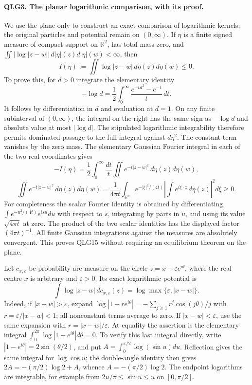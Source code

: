 \paragraph{QLG3. The planar logarithmic comparison, with its proof.}
We use the plane only to construct an exact comparison of logarithmic
kernels; the original particles and potential remain on \((0,\infty)\).
If \(\eta\) is a finite signed measure of compact support on
\(\mathbb R^2\), has total mass zero, and
\(\iint|\log|z-w||\,d|\eta|(z)d|\eta|(w)<\infty\), then
\[
 I(\eta):=\iint\log|z-w|\,d\eta(z)d\eta(w)\leq0.
 \tag{QLG15}
\]
To prove this, for \(d>0\) integrate the elementary identity
\[
 -\log d=\frac12\int_0^\infty
                    \frac{e^{-td^2}-e^{-t}}{t}\,dt.
\]
It follows by differentiation in \(d\) and evaluation at \(d=1\).
On any finite subinterval of \((0,\infty)\), the integral on the
right has the same sign as \(-\log d\) and absolute value at most
\(|\log d|\). The stipulated logarithmic integrability therefore
permits dominated passage to the full integral against \(d\eta^2\).
The constant term vanishes by the zero mass. The elementary Gaussian
Fourier integral in each of the two real coordinates gives
\[
 -I(\eta)=\frac12\int_0^\infty\frac{dt}{t}
       \iint e^{-t|z-w|^2}\,d\eta(z)d\eta(w),
\]
\[
 \iint e^{-t|z-w|^2}\,d\eta(z)d\eta(w)
 =\frac1{4\pi t}\int_{\mathbb R^2}
       e^{-|\xi|^2/(4t)}
       \left|\int e^{i\xi\cdot z}\,d\eta(z)\right|^2d\xi\geq0.
 \tag{QLG16}
\]
For completeness the scalar Fourier identity is obtained by
differentiating \(\int e^{-u^2/(4t)}e^{isu}du\) with respect to
\(s\), integrating by parts in \(u\), and using its value
\(\sqrt{4\pi t}\) at zero. The product of the two scalar identities
has the displayed factor \((4\pi t)^{-1}\). All finite Gaussian
integrations against the measures are absolutely convergent. This
proves QLG15 without requiring an equilibrium theorem on the plane.

Let \(c_{x,\varepsilon}\) be probability arc measure on the circle
\(z=x+\varepsilon e^{i\theta}\), where the real centre \(x\) is
arbitrary and \(\varepsilon>0\). Its exact logarithmic potential is
\[
 \int\log|z-w|\,dc_{x,\varepsilon}(z)
           =\log\max\{\varepsilon,|x-w|\}.
 \tag{QLG17}
\]
Indeed, if \(|x-w|>\varepsilon\), expand
\(\log|1-re^{i\theta}|=-\sum_{j\geq1}r^j\cos(j\theta)/j\)
with \(r=\varepsilon/|x-w|<1\); all nonconstant terms average to
zero. If \(|x-w|<\varepsilon\), use the same expansion with
\(r=|x-w|/\varepsilon\). At equality the assertion is the elementary
integral \(\int_0^{2\pi}\log|1-e^{i\theta}|d\theta=0\).
To verify this last integral directly, write
\(|1-e^{i\theta}|=2\sin(\theta/2)\), and put
\(A=\int_0^{\pi/2}\log(\sin u)du\). Reflection gives the same
integral for \(\log\cos u\); the double-angle identity then gives
\(2A=-(\pi/2)\log2+A\), whence \(A=-(\pi/2)\log2\).
The endpoint logarithms are integrable, for example from
\(2u/\pi\leq\sin u\leq u\) on \([0,\pi/2]\).

